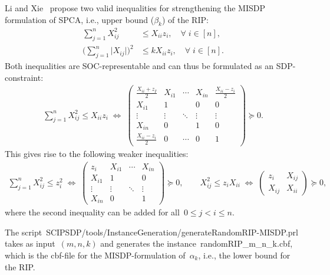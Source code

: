 \documentclass[11pt,a4paper]{article}
\newcommand{\abs}[1]{\lvert{#1}\rvert}
\theoremstyle{definition}
\begin{document}
Li and Xie~\cite{LiX20} propose two valid inequalities for strengthening
the MISDP formulation of SPCA, i.e., upper bound ($\beta_k$) of the RIP:
\begin{align*}
  \sum_{j=1}^n X_{ij}^2 &\leq X_{ii}z_i,\quad \forall \; i \in [n],\\
  \big(\sum_{j=1}^n \abs{X_{ij}}\big)^2 &\leq kX_{ii}z_i, \quad \forall \;
                                          i \in [n].
\end{align*}
Both inequalities are SOC-representable and can thus be formulated as an SDP-constraint:
\begin{align}\label{eq:ValidSOCPineqSDP}
  \sum_{j=1}^n X_{ij}^2 \leq X_{ii}z_i \; \Leftrightarrow \;
  \begin{pmatrix}
    \tfrac{X_{ii}+z_I}{2} & X_{i1} & \cdots & X_{in} & \tfrac{X_{ii}-z_i}{2}
    \\
    X_{i1} & 1 & & 0 & 0 \\
    \vdots &\vdots & \ddots & \vdots & \vdots \\
    X_{in} & 0 & & 1 & 0 \\
    \tfrac{X_{ii}-z_i}{2} & 0 & \cdots & 0 & 1
  \end{pmatrix} \succeq 0.
\end{align}
This gives rise to the following weaker inequalities:
\begin{align*}
  \sum_{j=1}^n X_{ij}^2 \leq z_i^2 \; \Leftrightarrow \;
  \begin{pmatrix}
    z_i & X_{i1} & \cdots & X_{in} \\
    X_{i1} & 1 & & 0 \\
    \vdots &\vdots & \ddots & \vdots \\
    X_{in} & 0 & & 1
  \end{pmatrix} \succeq 0, \qquad
                   X_{ij}^2 \leq z_iX_{ii}  \; \Leftrightarrow \;
                   \begin{pmatrix}
                     z_i & X_{ij} \\
                     X_{ij} & X_{ii}
                   \end{pmatrix} \succeq 0,
\end{align*}
where the second inequality can be added for all~$0\leq j < i\leq n$.

The
script~\textsf{SCIPSDP/tools/InstanceGeneration/generateRandomRIP-MISDP.prl}
takes as input~$(m,n,k)$ and generates the
instance~\textsf{randomRIP\_m\_n\_k.cbf}, which is the cbf-file for the
MISDP-formulation of~$\alpha_k$, i.e., the lower bound for the RIP.
\end{document}
